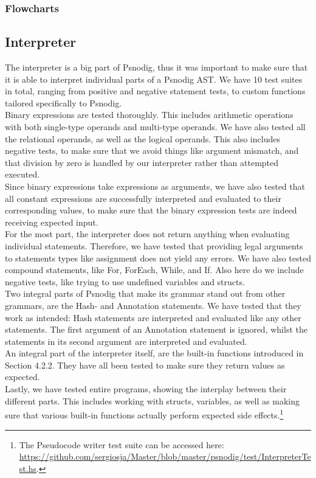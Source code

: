 \subsubsection{Flowcharts}


\subsection{Interpreter}

The interpreter is a big part of Psnodig, thus it was important to make sure that it is able to interpret individual parts of a Psnodig AST. We have 10 test suites in total, ranging from positive and negative statement tests, to custom functions tailored specifically to Psnodig. \\

Binary expressions are tested thoroughly. This includes arithmetic operations with both single-type operands and multi-type operands. We have also tested all the relational operands, as well as the logical operands. This also includes negative tests, to make sure that we avoid things like argument mismatch, and that division by zero is handled by our interpreter rather than attempted executed. \\

Since binary expressions take expressions as arguments, we have also tested that all constant expressions are successfully interpreted and evaluated to their corresponding values, to make sure that the binary expression tests are indeed receiving expected input. \\

For the most part, the interpreter does not return anything when evaluating individual statements. Therefore, we have tested that providing legal arguments to statements types like assignment does not yield any errors. We have also tested compound statements, like For, ForEach, While, and If. Also here do we include negative tests, like trying to use undefined variables and structs. \\

Two integral parts of Psnodig that make its grammar stand out from other grammars, are the Hash- and Annotation statements. We have tested that they work as intended: Hash statements are interpreted and evaluated like any other statements. The first argument of an Annotation statement is ignored, whilst the statements in its second argument are interpreted and evaluated. \\

An integral part of the interpreter itself, are the built-in functions introduced in Section 4.2.2. They have all been tested to make sure they return values as expected. \\

Lastly, we have tested entire programs, showing the interplay between their different parts. This includes working with structs, variables, as well as making sure that various built-in functions actually perform expected side effects.\footnote{The Pseudocode writer test suite can be accessed here: \url{https://github.com/sergiosja/Master/blob/master/psnodig/test/InterpreterTest.hs}.}